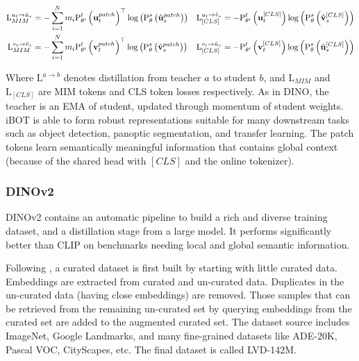 \begin{align}
    \mathrm{L}_{MIM}^{u_t \rightarrow \hat{u}_s} &= -\sum_{i = 1}^{N}
        m_i \textup{P}_{\theta'}^t\left(\mathbf{u}_t^{patch}\right)^{
            \top} \mathrm{log} \left( \textup{P}_{\theta}^s 
            \left(\hat{\mathbf{u}}_s^{patch}\right)\right) &
    \mathrm{L}_{\left[CLS\right]}^{u_t \rightarrow \hat{v}_s} &=
        - \textup{P}_{\theta'}^{t} \left(
            \mathbf{u}_t^{\left[CLS\right]}\right) \mathrm{log} \left(
            \textup{P}_{\theta}^s\left(\hat{\mathbf{v}}_s^{
            \left[CLS\right]}\right)\right) \nonumber \\
    \mathrm{L}_{MIM}^{v_t \rightarrow \hat{v}_s} &= -\sum_{i = 1}^{N}
        m_i \textup{P}_{\theta'}^t\left(\mathbf{v}_t^{patch}\right)^{
            \top} \mathrm{log} \left( \textup{P}_{\theta}^s 
            \left(\hat{\mathbf{v}}_s^{patch}\right)\right) &
    \mathrm{L}_{\left[CLS\right]}^{v_t \rightarrow \hat{u}_s} &=
        - \textup{P}_{\theta'}^{t} \left(
            \mathbf{v}_t^{\left[CLS\right]}\right) \mathrm{log} \left(
            \textup{P}_{\theta}^s\left(\hat{\mathbf{u}}_s^{
            \left[CLS\right]}\right)\right)
\end{align}

Where $\mathrm{L}^{a \rightarrow b}$ denotes distillation from teacher
$a$ to student $b$, and $\mathrm{L}_{MIM}$ and $\mathrm{L}_{
\left[CLS\right]}$ are MIM tokens and CLS token losses respectively.
As in DINO, the teacher is an EMA of student, updated through momentum
of student weights. iBOT is able to form robust representations
suitable for many downstream tasks such as object detection, panoptic
segmentation, and transfer learning. The patch tokens learn
semantically meaningful information that contains global context
(because of the shared head with $\left[CLS\right]$ and the online
tokenizer).

\subsubsection{DINOv2}
\label{subsec:fm-dinov2}


DINOv2 \cite{Oquab2023DINOv2LR} contains an automatic pipeline to
build a rich and diverse training dataset, and a distillation stage
from a large model. It performs significantly better than CLIP
\cite{Radford2021LearningTV} on benchmarks needing local and global
semantic information.

Following \cite{Pizzi2022ASD}, a curated dataset is first built by
starting with little curated data. Embeddings are extracted from
curated and un-curated data. Duplicates in the un-curated data (having
close embeddings) are removed. Those samples that can be retrieved
from the remaining un-curated set by querying embeddings from the
curated set are added to the augmented curated set. The dataset source
includes ImageNet, Google Landmarks, and many fine-grained datasets
like ADE-20K, Pascal VOC, CityScapes, etc. The final dataset is called
LVD-142M.

